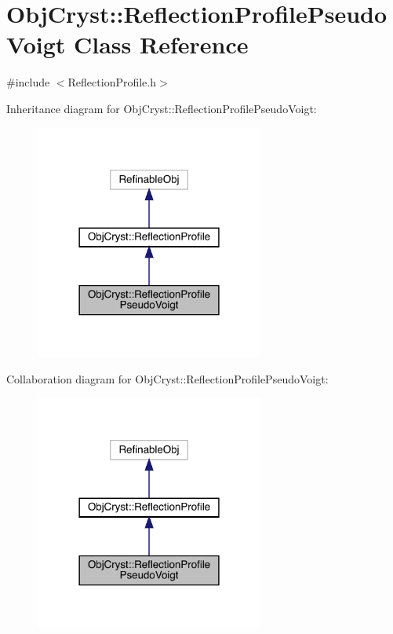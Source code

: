 \hypertarget{class_obj_cryst_1_1_reflection_profile_pseudo_voigt}{}\section{Obj\+Cryst\+::Reflection\+Profile\+Pseudo\+Voigt Class Reference}
\label{class_obj_cryst_1_1_reflection_profile_pseudo_voigt}


{\ttfamily \#include $<$Reflection\+Profile.\+h$>$}



Inheritance diagram for Obj\+Cryst\+::Reflection\+Profile\+Pseudo\+Voigt\+:
\nopagebreak
\begin{figure}[H]
\begin{center}
\leavevmode
\includegraphics[width=213pt]{class_obj_cryst_1_1_reflection_profile_pseudo_voigt__inherit__graph}
\end{center}
\end{figure}


Collaboration diagram for Obj\+Cryst\+::Reflection\+Profile\+Pseudo\+Voigt\+:
\nopagebreak
\begin{figure}[H]
\begin{center}
\leavevmode
\includegraphics[width=213pt]{class_obj_cryst_1_1_reflection_profile_pseudo_voigt__coll__graph}
\end{center}
\end{figure}
